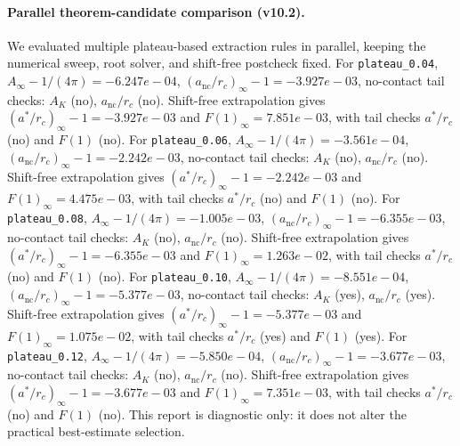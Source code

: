 \paragraph{Parallel theorem-candidate comparison (v10.2).}
We evaluated multiple plateau-based extraction rules in parallel, keeping the numerical sweep, root solver, and shift-free postcheck fixed. For \texttt{plateau_0.04}, $A_\infty-1/(4\pi)=-6.247e-04$, $(a_{\mathrm{nc}}/r_c)_\infty-1=-3.927e-03$, no-contact tail checks: $A_K$ (no), $a_{\mathrm{nc}}/r_c$ (no). Shift-free extrapolation gives $(a^*/r_c)_\infty-1=-3.927e-03$ and $F(1)_\infty=7.851e-03$, with tail checks $a^*/r_c$ (no) and $F(1)$ (no). For \texttt{plateau_0.06}, $A_\infty-1/(4\pi)=-3.561e-04$, $(a_{\mathrm{nc}}/r_c)_\infty-1=-2.242e-03$, no-contact tail checks: $A_K$ (no), $a_{\mathrm{nc}}/r_c$ (no). Shift-free extrapolation gives $(a^*/r_c)_\infty-1=-2.242e-03$ and $F(1)_\infty=4.475e-03$, with tail checks $a^*/r_c$ (no) and $F(1)$ (no). For \texttt{plateau_0.08}, $A_\infty-1/(4\pi)=-1.005e-03$, $(a_{\mathrm{nc}}/r_c)_\infty-1=-6.355e-03$, no-contact tail checks: $A_K$ (no), $a_{\mathrm{nc}}/r_c$ (no). Shift-free extrapolation gives $(a^*/r_c)_\infty-1=-6.355e-03$ and $F(1)_\infty=1.263e-02$, with tail checks $a^*/r_c$ (no) and $F(1)$ (no). For \texttt{plateau_0.10}, $A_\infty-1/(4\pi)=-8.551e-04$, $(a_{\mathrm{nc}}/r_c)_\infty-1=-5.377e-03$, no-contact tail checks: $A_K$ (yes), $a_{\mathrm{nc}}/r_c$ (yes). Shift-free extrapolation gives $(a^*/r_c)_\infty-1=-5.377e-03$ and $F(1)_\infty=1.075e-02$, with tail checks $a^*/r_c$ (yes) and $F(1)$ (yes). For \texttt{plateau_0.12}, $A_\infty-1/(4\pi)=-5.850e-04$, $(a_{\mathrm{nc}}/r_c)_\infty-1=-3.677e-03$, no-contact tail checks: $A_K$ (no), $a_{\mathrm{nc}}/r_c$ (no). Shift-free extrapolation gives $(a^*/r_c)_\infty-1=-3.677e-03$ and $F(1)_\infty=7.351e-03$, with tail checks $a^*/r_c$ (no) and $F(1)$ (no). This report is diagnostic only: it does not alter the practical best-estimate selection.
